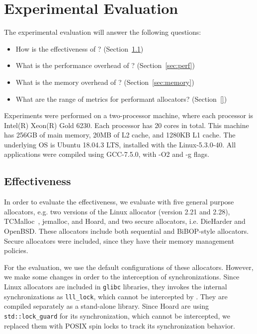 \section{Experimental Evaluation}
\label{sec:evaluation}

The experimental evaluation will answer the following questions:
\begin{itemize}
\item How is the effectiveness of \MP{}? (Section~\ref{sec:effectiveness}) 	
\item What is the performance overhead of \MP{}? (Section~\ref{sec:perf})
\item What is the memory overhead of \MP{}? (Section~\ref{sec:memory})
\item What are the range of metrics for performant allocators? (Section~\ref{})
\end{itemize}

Experiments were performed on a two-processor machine, where each processor is Intel(R) Xeon(R) Gold 6230. Each processor has 20 cores in total. This machine has 256GB of main memory, 20MB of L2 cache, and 1280KB L1 cache. The underlying OS is Ubuntu 18.04.3 LTS, installed with the Linux-5.3.0-40. All applications were compiled using GCC-7.5.0, with -O2 and -g flags.

\subsection{Effectiveness}
\label{sec:effectiveness}

In order to evaluate the effectiveness, we evaluate \MP{} with five general purpose allocators, e.g. two versions of the Linux allocator (version 2.21 and 2.28), TCMalloc~\citep{tcmalloc}, jemalloc, and Hoard, and two secure allocators, i.e. DieHarder and OpenBSD. These allocators include both sequential and BiBOP-style allocators. Secure allocators were included, since they have their memory management policies. 

For the evaluation, we use the default configurations of these allocators. However, we make some changes in order to the interception of synchronizations. Since Linux allocators are included in \texttt{glibc} libraries, they invokes the internal synchronizations as \texttt{lll\_lock}, which cannot be intercepted by \MP{}. They are compiled separately as a stand-alone library. Since Hoard are using \texttt{std::lock\_guard} for its synchronization, which cannot be intercepted, we replaced them with POSIX spin locks to track its synchronization behavior.

